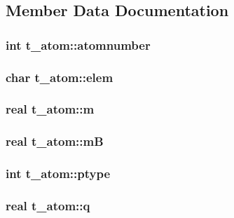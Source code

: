 \subsection{\-Member \-Data \-Documentation}
\hypertarget{structt__atom_a41b85909dad96f4cc1e242ac755124fd}{
\subsubsection[{atomnumber}]{\setlength{\rightskip}{0pt plus 5cm}int {\bf t\-\_\-atom\-::atomnumber}}}\label{structt__atom_a41b85909dad96f4cc1e242ac755124fd}
\hypertarget{structt__atom_a0e2204207704f144f602b9d5a0a2df3a}{
\subsubsection[{elem}]{\setlength{\rightskip}{0pt plus 5cm}char {\bf t\-\_\-atom\-::elem}}}\label{structt__atom_a0e2204207704f144f602b9d5a0a2df3a}
\hypertarget{structt__atom_a251edd44fc9d9e00b48a175a8753427b}{
\subsubsection[{m}]{\setlength{\rightskip}{0pt plus 5cm}real {\bf t\-\_\-atom\-::m}}}\label{structt__atom_a251edd44fc9d9e00b48a175a8753427b}
\hypertarget{structt__atom_a1e42dd1e44adae7a4e75fef4da528100}{
\subsubsection[{m\-B}]{\setlength{\rightskip}{0pt plus 5cm}real {\bf t\-\_\-atom\-::m\-B}}}\label{structt__atom_a1e42dd1e44adae7a4e75fef4da528100}
\hypertarget{structt__atom_a461ee3f835644cb67c8dbd1c62294171}{
\subsubsection[{ptype}]{\setlength{\rightskip}{0pt plus 5cm}int {\bf t\-\_\-atom\-::ptype}}}\label{structt__atom_a461ee3f835644cb67c8dbd1c62294171}
\hypertarget{structt__atom_aa3480cb017c3bb1297e68d141654e216}{
\subsubsection[{q}]{\setlength{\rightskip}{0pt plus 5cm}real {\bf t\-\_\-atom\-::q}}}\label{structt__atom_aa3480cb017c3bb1297e68d141654e216}
